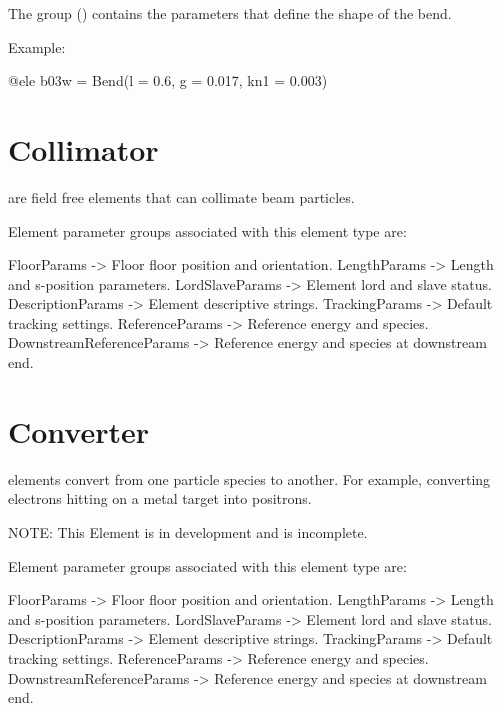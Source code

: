 The  group () contains the parameters that define the shape of the bend.

Example:
\begin{example}
  @ele b03w = Bend(l = 0.6, g = 0.017, kn1 = 0.003)
\end{example}

\newpage

\section{Collimator}
\label{s:collimator}

 are field free elements that can collimate beam particles.

Element parameter groups associated with this element type are:
\TOPrule
\begin{example}
  FloorParams -> Floor floor position and orientation.  
  LengthParams        -> Length and s-position parameters.  
  LordSlaveParams     -> Element lord and slave status.  
  DescriptionParams   -> Element descriptive strings.  
  TrackingParams      -> Default tracking settings.  
  ReferenceParams     -> Reference energy and species. 
  DownstreamReferenceParams -> Reference energy and species at downstream end. 
\end{example}
\BOTTOMrule

\section{Converter}
\label{s:converter}

 elements convert from one particle species to another. 
For example, converting electrons hitting on a metal target into positrons.

NOTE: This Element is in development and is incomplete.

Element parameter groups associated with this element type are:
\TOPrule
\begin{example}
  FloorParams -> Floor floor position and orientation.  
  LengthParams        -> Length and s-position parameters.  
  LordSlaveParams     -> Element lord and slave status.  
  DescriptionParams   -> Element descriptive strings.  
  TrackingParams      -> Default tracking settings.  
  ReferenceParams     -> Reference energy and species. 
  DownstreamReferenceParams -> Reference energy and species at downstream end. 
\end{example}
\BOTTOMrule

